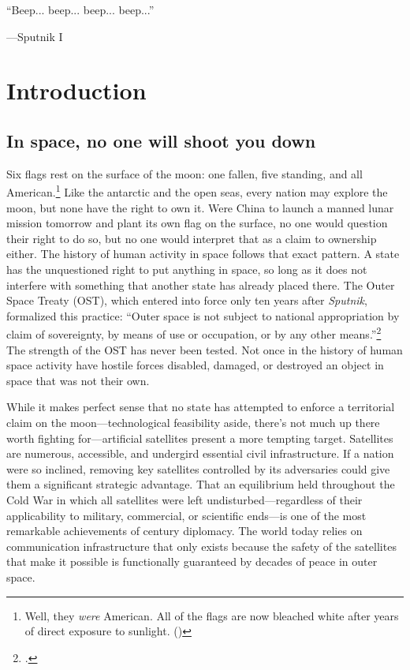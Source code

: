 \documentclass{memoir}
\begin{document}
\epigraph{\hfill``Beep... beep... beep... beep...''\hspace*{1cm}}{---Sputnik I}

\section{Introduction}
\subsection{In space, no one will shoot you down}
Six flags rest on the surface of the moon: one fallen, five standing, and all American.\footnote{Well, they \emph{were} American. All of the flags are now bleached white after years of direct exposure to sunlight. (\cite{spudis_faded_2011})} Like the antarctic and the open seas, every nation may explore the moon, but none have the right to own it. Were China to launch a manned lunar mission tomorrow and plant its own flag on the surface, no one would question their right to do so, but no one would interpret that as a claim to ownership either. The history of human activity in space follows that exact pattern. A state has the unquestioned right to put anything in space, so long as it does not interfere with something that another state has already placed there. The Outer Space Treaty (OST), which entered into force only ten years after \emph{Sputnik}, formalized this practice: ``Outer space \textelp{} is not subject to national appropriation by claim of sovereignty, by means of use or occupation, or by any other means.''\footcite{noauthor_outer_1966} The strength of the OST has never been tested. Not once in the history of human space activity have hostile forces disabled, damaged, or destroyed an object in space that was not their own.

While it makes perfect sense that no state has attempted to enforce a territorial claim on the moon---technological feasibility aside, there's not much up there worth fighting for---artificial satellites present a more tempting target. Satellites are numerous, accessible, and undergird essential civil infrastructure. If a nation were so inclined, removing key satellites controlled by its adversaries could give them a significant strategic advantage. That an equilibrium held throughout the Cold War in which all satellites were left undisturbed---regardless of their applicability to military, commercial, or scientific ends---is one of the most remarkable achievements of  century diplomacy. The world today relies on communication infrastructure that only exists because the safety of the satellites that make it possible is functionally guaranteed by decades of peace in outer space.
\end{document}
